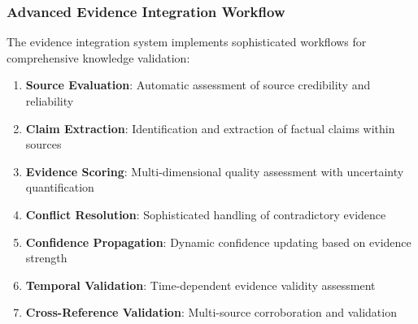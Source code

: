 \documentclass[12pt,a4paper,twoside]{article}
\begin{document}
\subsubsection{Advanced Evidence Integration Workflow}

The evidence integration system implements sophisticated workflows for comprehensive knowledge validation:

\begin{enumerate}
\item \textbf{Source Evaluation}: Automatic assessment of source credibility and reliability
\item \textbf{Claim Extraction}: Identification and extraction of factual claims within sources
\item \textbf{Evidence Scoring}: Multi-dimensional quality assessment with uncertainty quantification
\item \textbf{Conflict Resolution}: Sophisticated handling of contradictory evidence
\item \textbf{Confidence Propagation}: Dynamic confidence updating based on evidence strength
\item \textbf{Temporal Validation}: Time-dependent evidence validity assessment
\item \textbf{Cross-Reference Validation}: Multi-source corroboration and validation
\end{enumerate}
\end{document}
